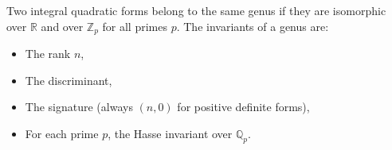 Two integral quadratic forms belong to the same genus if they are isomorphic over $\mathbb{R}$ and over $\mathbb{Z}_p$ for all primes $p$. The invariants of a genus are:
\begin{itemize}
\item The rank $n$,
\item The discriminant,
\item The signature (always $(n, 0)$ for positive definite forms),
\item For each prime $p$, the Hasse invariant over $\mathbb{Q}_p$.
\end{itemize}
